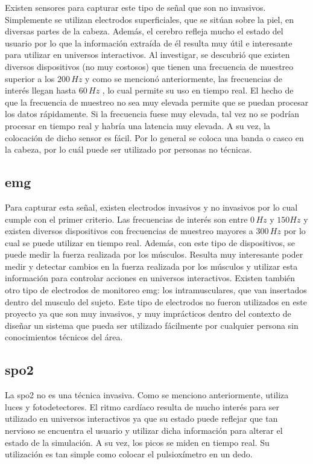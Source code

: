Existen sensores para capturar este tipo de señal que son no invasivos. Simplemente se utilizan electrodos superficiales, que se sitúan sobre la piel, en diversas partes de la cabeza. Además, el cerebro refleja mucho el estado del usuario por lo que la información extraída de él resulta muy útil e interesante para utilizar en universos interactivos. Al investigar, se descubrió que existen diversos dispositivos (no muy costosos) que tienen una frecuencia de muestreo superior a los $200 \, Hz$ y como se mencionó anteriormente, las frecuencias de interés llegan hasta $60 \, Hz$ , lo cual  permite su uso en tiempo real. El hecho de que la frecuencia de muestreo no sea muy elevada permite que se puedan procesar los datos rápidamente. Si la frecuencia fuese muy elevada, tal vez no se podrían procesar en tiempo real y habría una latencia muy elevada. A su vez, la colocación de dicho sensor es fácil. Por lo general se coloca una banda o casco en la cabeza, por lo cuál puede ser utilizado por personas no técnicas.

\subsection{\acrshort{emg}}

Para capturar esta señal, existen electrodos invasivos y no invasivos por lo cual cumple con el primer criterio. Las frecuencias de interés son entre $0 \, Hz $ y $150 Hz$ y existen diversos dispositivos con frecuencias de muestreo mayores a $300 \, Hz$ por lo cual se puede utilizar en tiempo real. Además, con este tipo de dispositivos, se puede medir la fuerza realizada por los músculos. Resulta muy interesante poder medir y detectar cambios en la fuerza realizada por los músculos y utilizar esta información para controlar acciones en universos interactivos. Existen también otro tipo de electrodos de monitoreo \acrshort{emg}: los intramusculares, que van insertados dentro del musculo del sujeto. Este tipo de electrodos no fueron utilizados en este proyecto ya que son muy invasivos, y muy imprácticos dentro del contexto de diseñar un sistema que pueda ser utilizado fácilmente por cualquier persona sin conocimientos técnicos del área.

\subsection{\acrshort{spo2}}

La \gls{spo2} no es una técnica invasiva. Como se menciono anteriormente, utiliza luces y fotodetectores. El ritmo cardíaco resulta de mucho interés para ser utilizado en universos interactivos ya que su estado puede reflejar que tan nervioso se encuentra el usuario y utilizar dicha información para alterar el estado de la simulación. A su vez, los picos se miden en tiempo real. Su utilización es tan simple como colocar el pulsioxímetro en un dedo.

